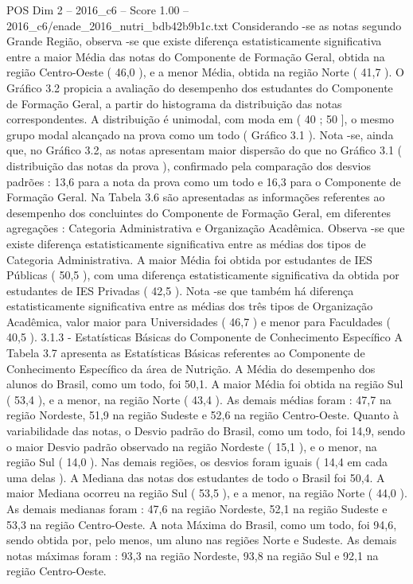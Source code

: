 \begin{textsample}{POS Dim 2 – 2016\_c6 – Score 1.00 – 2016\_c6/enade\_2016\_nutri\_bdb42b9b1c.txt}
Considerando -se as notas segundo Grande Região, observa -se que existe diferença estatisticamente significativa entre a maior Média das notas do Componente de Formação Geral, obtida na região Centro-Oeste ( 46,0 ), e a menor Média, obtida na região Norte ( 41,7 ).
O Gráfico 3.2 propicia a avaliação do desempenho dos estudantes do Componente de Formação Geral, a partir do histograma da distribuição das notas correspondentes.
A distribuição é unimodal, com moda em ( 40 ; 50 ], o mesmo grupo modal alcançado na prova como um todo ( Gráfico 3.1 ).
Nota -se, ainda que, no Gráfico 3.2, as notas apresentam maior dispersão do que no Gráfico 3.1 ( distribuição das notas da prova ), confirmado pela comparação dos desvios padrões : 13,6 para a nota da prova como um todo e 16,3 para o Componente de Formação Geral.
Na Tabela 3.6 são apresentadas as informações referentes ao desempenho dos concluintes do Componente de Formação Geral, em diferentes agregações : Categoria Administrativa e Organização Acadêmica.
Observa -se que existe diferença estatisticamente significativa entre as médias dos tipos de Categoria Administrativa.
A maior Média foi obtida por estudantes de IES Públicas ( 50,5 ), com uma diferença estatisticamente significativa da obtida por estudantes de IES Privadas ( 42,5 ).
Nota -se que também há diferença estatisticamente significativa entre as médias dos três tipos de Organização Acadêmica, valor maior para Universidades ( 46,7 ) e menor para Faculdades ( 40,5 ). 3.1.3 - Estatísticas Básicas do Componente de Conhecimento Específico A Tabela 3.7 apresenta as Estatísticas Básicas referentes ao Componente de Conhecimento Específico da área de Nutrição.
A Média do desempenho dos alunos do Brasil, como um todo, foi 50,1.
A maior Média foi obtida na região Sul ( 53,4 ), e a menor, na região Norte ( 43,4 ).
As demais médias foram : 47,7 na região Nordeste, 51,9 na região Sudeste e 52,6 na região Centro-Oeste.
Quanto à variabilidade das notas, o Desvio padrão do Brasil, como um todo, foi 14,9, sendo o maior Desvio padrão observado na região Nordeste ( 15,1 ), e o menor, na região Sul ( 14,0 ).
Nas demais regiões, os desvios foram iguais ( 14,4 em cada uma delas ).
A Mediana das notas dos estudantes de todo o Brasil foi 50,4.
A maior Mediana ocorreu na região Sul ( 53,5 ), e a menor, na região Norte ( 44,0 ).
As demais medianas foram : 47,6 na região Nordeste, 52,1 na região Sudeste e 53,3 na região Centro-Oeste.
A nota Máxima do Brasil, como um todo, foi 94,6, sendo obtida por, pelo menos, um aluno nas regiões Norte e Sudeste.
As demais notas máximas foram : 93,3 na região Nordeste, 93,8 na região Sul e 92,1 na região Centro-Oeste.

\end{textsample}
